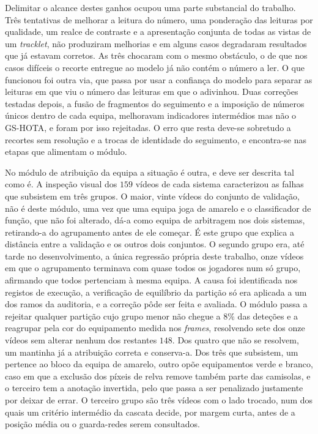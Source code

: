 Delimitar o alcance destes ganhos ocupou uma parte substancial do trabalho. Três tentativas de
melhorar a leitura do número, uma ponderação das leituras por qualidade, um realce de contraste e a
apresentação conjunta de todas as vistas de um \emph{tracklet}, não produziram melhorias e em alguns
casos degradaram resultados que já estavam corretos. As três chocaram com o mesmo obstáculo, o de
que nos casos difíceis o recorte entregue ao modelo já não contém o número a ler. O que funcionou foi
outra via, que passa por usar a confiança do modelo para separar as leituras em que viu o número das leituras em
que o adivinhou. Duas correções testadas depois, a fusão de fragmentos do seguimento e a imposição de
números únicos dentro de cada equipa, melhoravam indicadores intermédios mas não o GS-HOTA, e foram
por isso rejeitadas. O erro que resta deve-se sobretudo a recortes sem resolução e a trocas
de identidade do seguimento, e encontra-se nas etapas que alimentam o módulo.

No módulo de atribuição da equipa a situação é outra, e deve ser descrita tal como é. A
inspeção visual dos $159$ vídeos de cada sistema caracterizou as falhas que subsistem em três
grupos. O maior, vinte vídeos do conjunto de validação, não é deste módulo, uma vez que uma equipa joga de
amarelo e o classificador de função, que não foi alterado, dá-a como equipa de arbitragem nos dois
sistemas, retirando-a do agrupamento antes de ele começar. É este grupo que explica a distância
entre a validação e os outros dois conjuntos. O segundo grupo era, até tarde no
desenvolvimento, a única regressão própria deste trabalho, onze vídeos em que o agrupamento terminava
com quase todos os jogadores num só grupo, afirmando que todos pertenciam à mesma equipa. A causa
foi identificada nos registos de execução, a verificação de equilíbrio da partição só era aplicada a
um dos ramos da auditoria, e a correção pôde ser feita e avaliada. O módulo passa a rejeitar
qualquer partição cujo grupo menor não chegue a $8\%$ das deteções e a reagrupar pela cor do
equipamento medida nos \emph{frames}, resolvendo sete dos onze vídeos sem alterar nenhum dos
restantes $148$. Dos quatro que não se resolvem, um mantinha já a atribuição correta e conserva-a.
Dos três que subsistem, um pertence ao bloco da equipa de amarelo, outro opõe
equipamentos verde e branco, caso em que a exclusão dos píxeis de relva remove também parte das
camisolas, e o terceiro tem a anotação invertida, pelo que passa a ser penalizado justamente por
deixar de errar. O terceiro grupo são três vídeos com o lado trocado, num dos quais um critério
intermédio da cascata decide, por margem curta, antes de a posição média ou o guarda-redes serem
consultados.

